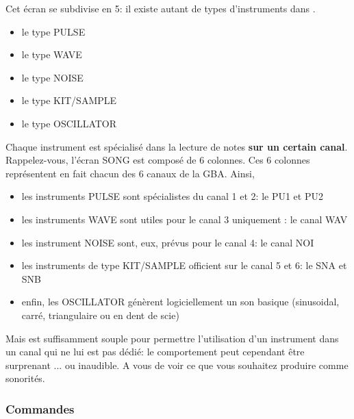Cet écran se subdivise en 5: il existe autant de types d'instruments dans \FAT.
\medskip

\begin{itemize}
    \item{le type PULSE}
    \item{le type WAVE}
    \item{le type NOISE}
    \item{le type KIT/SAMPLE}
    \item{le type OSCILLATOR}
\end{itemize}\medskip

 Chaque instrument est spécialisé dans la lecture de notes {\bf sur un certain canal}.
 Rappelez-vous, l'écran SONG est composé de 6 colonnes.
 Ces 6 colonnes représentent en fait chacun des 6 canaux de la GBA. Ainsi,
 \medskip

 \begin{itemize}
    \item{les instruments PULSE sont spécialistes du canal 1 et 2: le PU1 et PU2}
    \item{les instruments WAVE sont utiles pour le canal 3 uniquement : le canal WAV}
    \item{les instrument NOISE sont, eux, prévus pour le canal 4: le canal NOI}
    \item{les instruments de type KIT/SAMPLE officient sur le canal 5 et 6: le SNA et SNB}
    \item{enfin, les OSCILLATOR génèrent logiciellement un son basique (sinusoidal, carré, triangulaire ou en dent de scie)}
 \end{itemize}\medskip

 Mais \FAT est suffisamment souple pour permettre l'utilisation d'un instrument dans un canal qui ne lui est pas dédié:
 le comportement peut cependant être surprenant ... ou inaudible.
 A vous de voir ce que vous souhaitez produire comme sonorités.

\subsubsection{Commandes}

